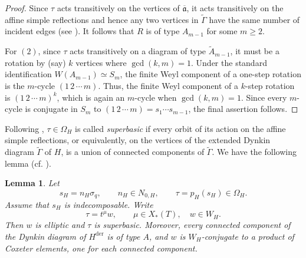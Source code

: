 \documentclass[11pt]{amsart}
\numberwithin{equation}{section}
\newtheorem{lemma}[lemma]{Lemma}
\theoremstyle{definition}
\theoremstyle{remark}
\begin{document}
\begin{proof}
Since $\tau$ acts transitively on the vertices of $\overline{\mathfrak{a}}$, it acts transitively on the affine simple reflections and hence any two vertices in $\tilde{\Gamma}$ have the same number of incident edges
(see \cite[Section~3.5]{HN}). It follows that $R$ is of type $A_{m-1}$ for some $m\geq2$.

For $(2)$, since $\tau$ acts transitively on a diagram of type $\widetilde{A}_{m-1}$, it must be a rotation by (say) $k$ vertices where
$\gcd(k,m)=1$. Under the standard identification
$W(A_{m-1})\simeq S_m$, the finite Weyl component of a one-step
rotation is the $m$-cycle $(1\,2\,\cdots\,m)$. 
Thus,
the finite Weyl component of a $k$-step rotation is
$(1\,2\,\cdots\,m)^k$, which is again an $m$-cycle when
$\gcd(k,m)=1$. Since every $m$-cycle is conjugate in $S_m$ to
$(1\,2\,\cdots\,m)=s_1\cdots s_{m-1}$, the final assertion follows.
\end{proof}
Following \cite[Section~3.5]{HN}, $\tau\in\Omega_H$ is called
\emph{superbasic} if every orbit of its action on the affine simple
reflections, or equivalently, on the vertices of the extended Dynkin diagram $\tilde{\Gamma}$ of $H$, is a union of connected components of $\tilde{\Gamma}$. We have the following lemma (cf. \cite[Section~5.9]{GHKR2}).
\begin{lemma}
\label{lem:elliptic-superbasic}
Let
\[
  s_H=n_H\sigma_q,\qquad n_H\in N_{0,H},
  \qquad \tau=p_H(s_H)\in\Omega_H.
\]
Assume that $s_H$ is indecomposable.
Write
\[
  \tau=t^\mu w,
  \qquad \mu\in X_*(T),\quad w\in W_H.
\]
Then $w$ is elliptic and
$\tau$ is superbasic. Moreover, every connected component of the Dynkin diagram of $H^{\mathrm{der}}$ is of type $A$, and $w$ is $W_H$-conjugate to a product of Coxeter elements, one for each connected component.
\end{lemma}
\end{document}
